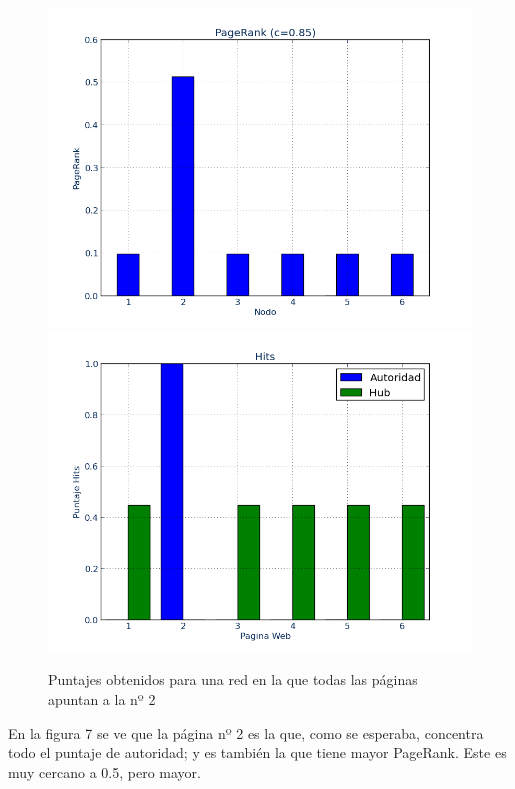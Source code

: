 \documentclass[a4paper]{article}
\begin{document}
\begin{figure}[htbp]
\centering
\includegraphics[scale=0.385]{img/todosal2.png}
\includegraphics[scale=0.385]{img/todosal2out.png}
\caption{Puntajes obtenidos para una red en la que todas las páginas apuntan a la nº 2}
\end{figure}

En la figura 7 se ve que la página nº 2 es la que, como se esperaba, concentra todo el puntaje de autoridad; y es también la que tiene mayor PageRank. Este es muy cercano a 0.5, pero mayor.
\end{document}

